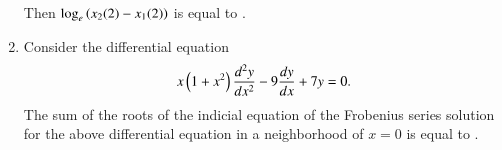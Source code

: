 \documentclass[journal,12pt,onecolumn]{IEEEtran}
\theoremstyle{remark}
\begin{document}
\begin{enumerate}[start=1, label=Q.\arabic*]
Then $\log_{e}\left(x_{2}(2)-x_{1}(2)\right)$ is equal to \underline{\hspace{2cm}}.

\hfill{}


\item Consider the differential equation
\[
x\left(1+x^{2}\right)\frac{d^{2}y}{dx^{2}} - 9\frac{dy}{dx}+7y=0.
\]
The sum of the roots of the indicial equation of the Frobenius series solution for the above differential equation in a neighborhood of $x=0$ is equal to \underline{\hspace{2cm}}.

\hfill{}












\end{enumerate}
\end{document}
